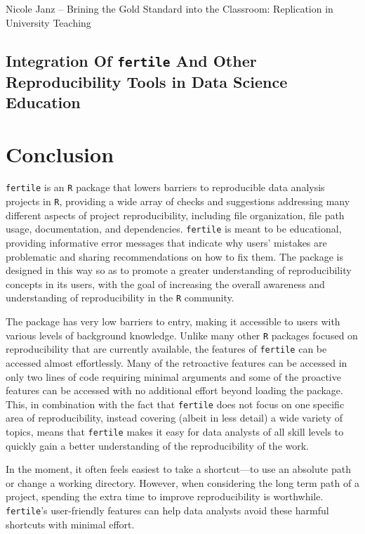 \documentclass[12pt,twoside]{reedthesis}
\begin{document}
Nicole Janz -- Brining the Gold Standard into the Classroom: Replication
in University Teaching

\section{\texorpdfstring{Integration Of \texttt{fertile} And Other
Reproducibility Tools in Data Science
Education}{Integration Of fertile And Other Reproducibility Tools in Data Science Education}}\label{integration-of-fertile-and-other-reproducibility-tools-in-data-science-education}

\chapter*{Conclusion}\label{conclusion}

\texttt{fertile} is an \texttt{R} package that lowers barriers to
reproducible data analysis projects in \texttt{R}, providing a wide
array of checks and suggestions addressing many different aspects of
project reproducibility, including file organization, file path usage,
documentation, and dependencies. \texttt{fertile} is meant to be
educational, providing informative error messages that indicate why
users' mistakes are problematic and sharing recommendations on how to
fix them. The package is designed in this way so as to promote a greater
understanding of reproducibility concepts in its users, with the goal of
increasing the overall awareness and understanding of reproducibility in
the \texttt{R} community.

The package has very low barriers to entry, making it accessible to
users with various levels of background knowledge. Unlike many other
\texttt{R} packages focused on reproducibility that are currently
available, the features of \texttt{fertile} can be accessed almost
effortlessly. Many of the retroactive features can be accessed in only
two lines of code requiring minimal arguments and some of the proactive
features can be accessed with no additional effort beyond loading the
package. This, in combination with the fact that \texttt{fertile} does
not focus on one specific area of reproducibility, instead covering
(albeit in less detail) a wide variety of topics, means that
\texttt{fertile} makes it easy for data analysts of all skill levels to
quickly gain a better understanding of the reproducibility of the work.

In the moment, it often feels easiest to take a shortcut---to use an
absolute path or change a working directory. However, when considering
the long term path of a project, spending the extra time to improve
reproducibility is worthwhile. \texttt{fertile}'s user-friendly features
can help data analysts avoid these harmful shortcuts with minimal
effort.
\end{document}
